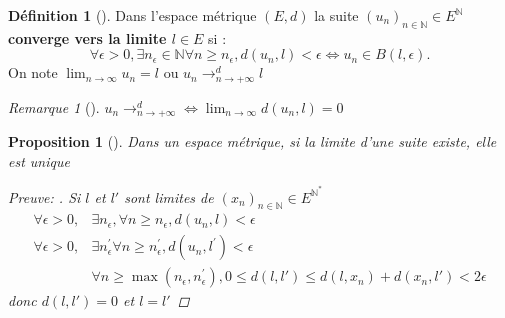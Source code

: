 \documentclass{article}
\theoremstyle{plain}%
\newtheorem{prop}[thm]{Proposition}
\theoremstyle{definition}
\newtheorem{defn}{Définition}[section]
\theoremstyle{remark}
\newtheorem*{rem}{Remarque}
\begin{document}
\begin{defn}[]
    Dans l'espace métrique $ (E,d) $ la suite $ (u_n)_{n \in \mathbb{N}} \in E^{\mathbb{N}}$ \textbf{converge vers la limite $ l \in E$ } si : 
    \[
        \forall \epsilon > 0, \exists n_\epsilon \in \mathbb{N} \forall n \geq n_\epsilon, d(u_n, l) < \epsilon \Leftrightarrow u_n \in B(l,\epsilon )
    .\]
    On note $ \lim_{n \to \infty} u_n = l $ ou $ u_n \to _{n \to +\infty }^d l$ 
\end{defn}

\begin{rem}[]
    $ u_n \to _{n \to +\infty }^d \Leftrightarrow \lim_{n \to \infty} d(u_n, l) = 0  $ 
\end{rem}

\begin{prop}[]
    Dans un espace métrique, si la limite d'une suite existe, elle est unique

    \begin{proof}[Preuve: ]
        Si $ l $ et $ l' $ sont limites de $ (x_n)_{n \in \mathbb{N}} \in E^{\mathbb{N}^*}$ 
        \begin{align*}
            \forall \epsilon > 0, &\exists n_\epsilon, \forall n \geq n_\epsilon, d(u_n, l) < \epsilon \\
            \forall \epsilon > 0, &\exists n_\epsilon^\prime  \forall n \geq n_\epsilon^\prime , d(u_n, l^\prime ) < \epsilon \\
                    &\forall n \geq \max (n_\epsilon , n_\epsilon ^\prime ), 0 \leq d(l,l') \leq d(l,x_n)+d(x_n,l')< 2 \epsilon 
        \end{align*}
        donc $ d(l,l')=0 $ et $ l=l' $ 
    \end{proof}
\end{prop}
\end{document}
